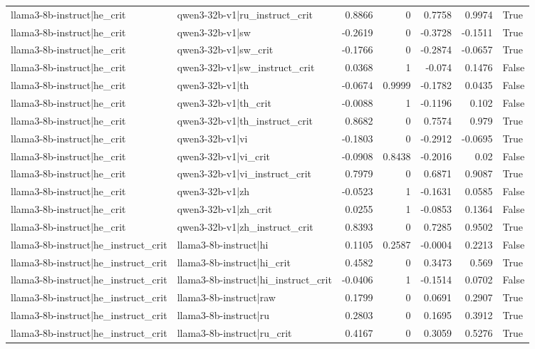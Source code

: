\begin{table}
\begin{tabular}{l l r r r r l}
llama3-8b-instruct|he_crit & qwen3-32b-v1|ru_instruct_crit & 0.8866 & 0 & 0.7758 & 0.9974 & True \\
llama3-8b-instruct|he_crit & qwen3-32b-v1|sw & -0.2619 & 0 & -0.3728 & -0.1511 & True \\
llama3-8b-instruct|he_crit & qwen3-32b-v1|sw_crit & -0.1766 & 0 & -0.2874 & -0.0657 & True \\
llama3-8b-instruct|he_crit & qwen3-32b-v1|sw_instruct_crit & 0.0368 & 1 & -0.074 & 0.1476 & False \\
llama3-8b-instruct|he_crit & qwen3-32b-v1|th & -0.0674 & 0.9999 & -0.1782 & 0.0435 & False \\
llama3-8b-instruct|he_crit & qwen3-32b-v1|th_crit & -0.0088 & 1 & -0.1196 & 0.102 & False \\
llama3-8b-instruct|he_crit & qwen3-32b-v1|th_instruct_crit & 0.8682 & 0 & 0.7574 & 0.979 & True \\
llama3-8b-instruct|he_crit & qwen3-32b-v1|vi & -0.1803 & 0 & -0.2912 & -0.0695 & True \\
llama3-8b-instruct|he_crit & qwen3-32b-v1|vi_crit & -0.0908 & 0.8438 & -0.2016 & 0.02 & False \\
llama3-8b-instruct|he_crit & qwen3-32b-v1|vi_instruct_crit & 0.7979 & 0 & 0.6871 & 0.9087 & True \\
llama3-8b-instruct|he_crit & qwen3-32b-v1|zh & -0.0523 & 1 & -0.1631 & 0.0585 & False \\
llama3-8b-instruct|he_crit & qwen3-32b-v1|zh_crit & 0.0255 & 1 & -0.0853 & 0.1364 & False \\
llama3-8b-instruct|he_crit & qwen3-32b-v1|zh_instruct_crit & 0.8393 & 0 & 0.7285 & 0.9502 & True \\
llama3-8b-instruct|he_instruct_crit & llama3-8b-instruct|hi & 0.1105 & 0.2587 & -0.0004 & 0.2213 & False \\
llama3-8b-instruct|he_instruct_crit & llama3-8b-instruct|hi_crit & 0.4582 & 0 & 0.3473 & 0.569 & True \\
llama3-8b-instruct|he_instruct_crit & llama3-8b-instruct|hi_instruct_crit & -0.0406 & 1 & -0.1514 & 0.0702 & False \\
llama3-8b-instruct|he_instruct_crit & llama3-8b-instruct|raw & 0.1799 & 0 & 0.0691 & 0.2907 & True \\
llama3-8b-instruct|he_instruct_crit & llama3-8b-instruct|ru & 0.2803 & 0 & 0.1695 & 0.3912 & True \\
llama3-8b-instruct|he_instruct_crit & llama3-8b-instruct|ru_crit & 0.4167 & 0 & 0.3059 & 0.5276 & True \\

\end{tabular}
\end{table}
